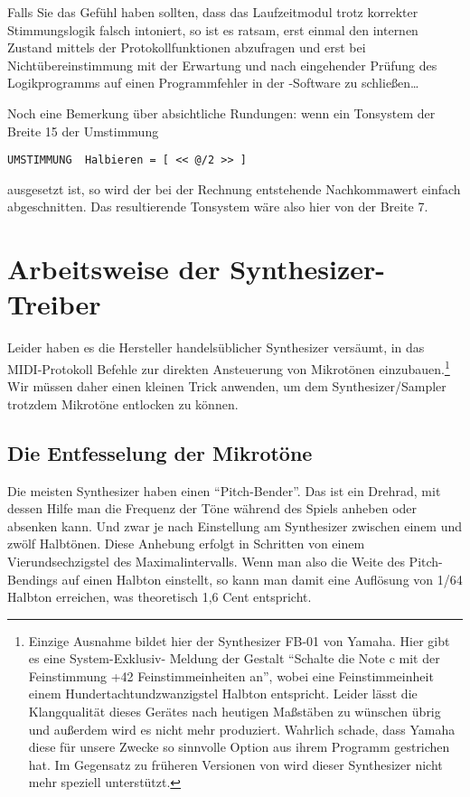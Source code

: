 Falls Sie das Gefühl haben sollten, dass das Laufzeitmodul trotz
korrekter Stimmungslogik falsch intoniert, so ist es ratsam, erst
einmal den internen Zustand mittels der Protokollfunktionen abzufragen
und erst bei Nichtübereinstimmung mit der
Erwartung und nach eingehender Prüfung des Logikprogramms auf einen
Programmfehler in der \mutabor{}-Software zu schließen\ldots

Noch eine Bemerkung über absichtliche Rundungen: wenn ein Tonsystem
der Breite 15 der Umstimmung
\begin{verbatim}
UMSTIMMUNG  Halbieren = [ << @/2 >> ]
\end{verbatim}
ausgesetzt ist, so wird der bei der Rechnung entstehende Nachkommawert
einfach abgeschnitten. Das resultierende Tonsystem wäre also hier von
der Breite 7.


\section{Arbeitsweise der Synthesizer-Treiber}\label{sec:arbe-der-synth}
\label{EINSTELLUNG}
Leider haben es die Hersteller handelsüblicher Synthesizer versäumt,
in das MIDI-Protokoll Befehle zur direkten Ansteuerung von Mikrotönen
einzubauen.\footnote{\label{FBNULLEINS}Einzige Ausnahme bildet hier der
Synthesizer FB-01 von Yamaha. Hier gibt es eine System-Exklusiv-
Meldung der Gestalt "`Schalte die Note c mit der Feinstimmung +42
Feinstimmeinheiten an"', wobei eine Feinstimmeinheit einem
Hundertachtundzwanzigstel Halbton entspricht. Leider lässt die
Klangqualität dieses Gerätes nach heutigen Maßstäben zu wünschen übrig
und außerdem wird es nicht mehr produziert. Wahrlich schade, dass
Yamaha diese für unsere Zwecke so sinnvolle Option aus ihrem Programm
gestrichen hat. Im Gegensatz zu früheren Versionen von \textbf{\mutabor{}} 
wird dieser Synthesizer nicht mehr speziell unterstützt.} Wir müssen
daher einen kleinen Trick anwenden, um dem Synthesizer/Sampler
trotzdem Mikrotöne entlocken zu können.

\subsection{Die Entfesselung der Mikrotöne}\label{sec:die-entfesselung-der}
Die meisten Synthesizer haben einen "`Pitch-Bender"'. Das ist ein
Drehrad, mit dessen Hilfe man die Frequenz der Töne während des Spiels
anheben oder absenken kann. Und zwar je nach Einstellung am
Synthesizer zwischen einem und zwölf Halbtönen. Diese Anhebung erfolgt
in Schritten von einem Vierundsechzigstel des Maximalintervalls. Wenn
man also die Weite des Pitch-Bendings auf einen Halbton einstellt, so
kann man damit eine Auflösung von 1/64 Halbton erreichen, was
theoretisch 1,6 Cent entspricht.

